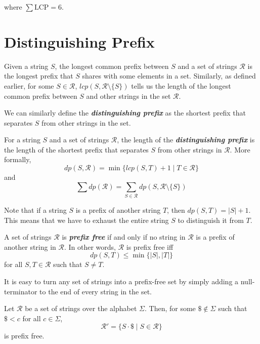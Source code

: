 where $\sum \text{LCP} = 6$.

\section{Distinguishing Prefix}

Given a string $S$, the longest common prefix between $S$ and a set of strings $\mathcal{R}$ is the longest prefix that $S$ shares with some elements in a set. Similarly, as defined earlier, for some $S \in \mathcal{R}$, $\mathit{lcp}(S,\mathcal{R} \setminus \{S\})$ tells us the length of the longest common prefix between $S$ and other strings in the set $\mathcal{R}$.

We can similarly define the \textit{\textbf{distinguishing prefix}} as the shortest prefix that separates $S$ from other strings in the set.

\begin{definition} \label{def:dist-prefix}
    For a string $S$ and a set of strings $\mathcal{R}$, the length of the \textit{\textbf{distinguishing prefix}} is the length of the shortest prefix that separates $S$ from other strings in $\mathcal{R}$. More formally,
    $$
    \mathit{dp}(S,\mathcal{R}) = \min\{\mathit{lcp}(S,T)+1 \mid T \in \mathcal{R}\}
    $$
    and
    $$
    \sum \mathit{dp}(\mathcal{R}) = \sum_{S \in \mathcal{R}} \mathit{dp}(S,\mathcal{R}\setminus \{S\})
    $$
\end{definition}

Note that if a string $S$ is a prefix of another string $T$, then $\mathit{dp}(S,T) = |S| + 1$. This means that we have to exhaust the entire string $S$ to distinguish it from $T$.

\begin{definition}
    A set of strings $\mathcal{R}$ is \textit{\textbf{prefix free}} if and only if no string in $\mathcal{R}$ is a prefix of another string in $\mathcal{R}$. In other words, $\mathcal{R}$ is prefix free iff
    $$
    \mathit{dp}(S,T) \leq \min\{|S|,|T|\}
    $$
    for all $S,T \in \mathcal{R}$ such that $S \neq T$.
\end{definition}

It is easy to turn any set of strings into a prefix-free set by simply adding a null-terminator to the end of every string in the set.

\begin{theorem}
    Let $\mathcal{R}$ be a set of strings over the alphabet $\Sigma$. Then, for some $\texttt{\$} \not\in \Sigma$ such that $\texttt{\$} < c$ for all $c \in \Sigma$,
    $$
    \mathcal{R}' = \{ S \cdot \texttt{\$} \mid S \in \mathcal{R} \}
    $$
    is prefix free.
\end{theorem}

